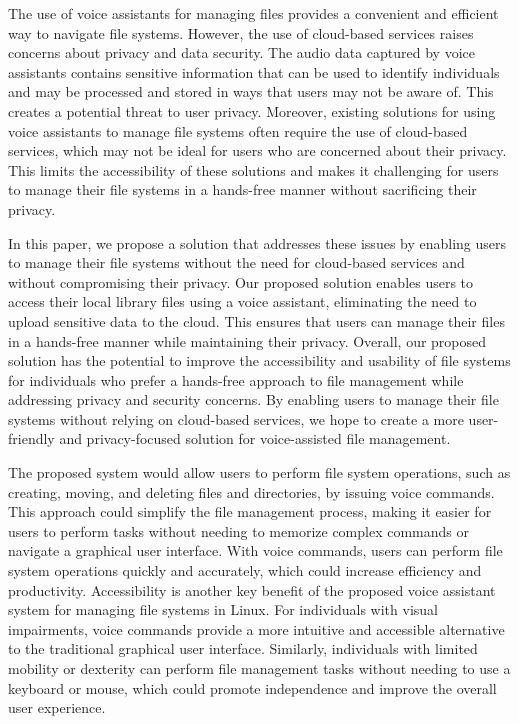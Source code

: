 \documentclass[conference]{IEEEtran}
\begin{document}
\par The use of voice assistants for managing files provides a convenient and efficient way to navigate file systems. However, the use of cloud-based services raises concerns about privacy and data security. The audio data captured by voice assistants contains sensitive information that can be used to identify individuals and may be processed and stored in ways that users may not be aware of. This creates a potential threat to user privacy. Moreover, existing solutions for using voice assistants to manage file systems often require the use of cloud-based services, which may not be ideal for users who are concerned about their privacy. This limits the accessibility of these solutions and makes it challenging for users to manage their file systems in a hands-free manner without sacrificing their privacy.

\par In this paper, we propose a solution that addresses these issues by enabling users to manage their file systems without the need for cloud-based services and without compromising their privacy. Our proposed solution enables users to access their local library files using a voice assistant, eliminating the need to upload sensitive data to the cloud. This ensures that users can manage their files in a hands-free manner while maintaining their privacy. Overall, our proposed solution has the potential to improve the accessibility and usability of file systems for individuals who prefer a hands-free approach to file management while addressing privacy and security concerns. By enabling users to manage their file systems without relying on cloud-based services, we hope to create a more user-friendly and privacy-focused solution for voice-assisted file management.

\par The proposed system would allow users to perform file system operations, such as creating, moving, and deleting files and directories, by issuing voice commands. This approach could simplify the file management process, making it easier for users to perform tasks without needing to memorize complex commands or navigate a graphical user interface. With voice commands, users can perform file system operations quickly and accurately, which could increase efficiency and productivity. Accessibility is another key benefit of the proposed voice assistant system for managing file systems in Linux. For individuals with visual impairments, voice commands provide a more intuitive and accessible alternative to the traditional graphical user interface. Similarly, individuals with limited mobility or dexterity can perform file management tasks without needing to use a keyboard or mouse, which could promote independence and improve the overall user experience.
\end{document}
